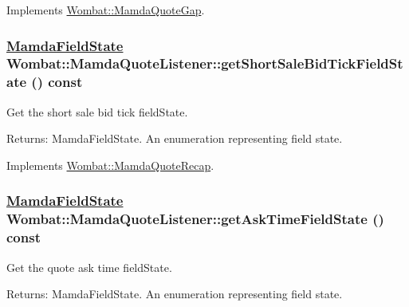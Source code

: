 Implements \hyperlink{classWombat_1_1MamdaQuoteGap_79a42883fe6a8fcb0832fab98202b912}{Wombat::Mamda\-Quote\-Gap}.\hypertarget{classWombat_1_1MamdaQuoteListener_35f256d26e13d0dc0302c256567f54ba}{
\subsubsection[getShortSaleBidTickFieldState]{\setlength{\rightskip}{0pt plus 5cm}\hyperlink{namespaceWombat_93aac974f2ab713554fd12a1fa3b7d2a}{Mamda\-Field\-State} Wombat::Mamda\-Quote\-Listener::get\-Short\-Sale\-Bid\-Tick\-Field\-State () const}}
\label{classWombat_1_1MamdaQuoteListener_35f256d26e13d0dc0302c256567f54ba}


Get the short sale bid tick field\-State. 

\begin{Desc}
\item[Returns:]Mamda\-Field\-State. An enumeration representing field state. \end{Desc}


Implements \hyperlink{classWombat_1_1MamdaQuoteRecap_cfcc9d7209b6d09009c084f37e2e0510}{Wombat::Mamda\-Quote\-Recap}.\hypertarget{classWombat_1_1MamdaQuoteListener_355651d7e3a9641c607fa3e82ce8e833}{
\subsubsection[getAskTimeFieldState]{\setlength{\rightskip}{0pt plus 5cm}\hyperlink{namespaceWombat_93aac974f2ab713554fd12a1fa3b7d2a}{Mamda\-Field\-State} Wombat::Mamda\-Quote\-Listener::get\-Ask\-Time\-Field\-State () const}}
\label{classWombat_1_1MamdaQuoteListener_355651d7e3a9641c607fa3e82ce8e833}


Get the quote ask time field\-State. 

\begin{Desc}
\item[Returns:]Mamda\-Field\-State. An enumeration representing field state. \end{Desc}


